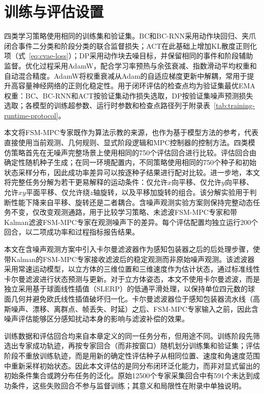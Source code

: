 \section{训练与评估设置}

四类学习策略使用相同的训练集和验证集。BC和BC-RNN采用动作块回归、夹爪闭合事件二分类和阶段分类的联合监督损失；ACT在此基础上增加KL散度正则化项（式~\eqref{eq:cvae-loss}）；DP采用动作块去噪目标，并保留相同的事件和阶段辅助监督。优化过程采用AdamW，配合学习率预热与余弦衰减、指数滑动平均权重和自动混合精度。AdamW将权重衰减从Adam的自适应梯度更新中解耦，常用于提升高容量神经网络的正则化稳定性\citep{loshchilov2019decoupled}。用于闭环评估的检查点均为验证集最优EMA权重：BC、BC-RNN和ACT按验证集动作损失选取，DP按验证集噪声预测损失选取；各模型的训练超参数、运行时参数和检查点路径列于附录表~\ref{tab:training-runtime-protocol}。

本文将FSM-MPC专家既作为算法示教的来源，也作为基于模型方法的参考，代表直接使用当前观测、几何规则、显式阶段逻辑和MPC控制器的控制方法。四类模仿策略首先在无噪声完整场景上使用相同的750个评估回合进行比较。评估回合由确定性随机种子生成；在同一环境配置内，不同策略使用相同的750个种子和初始状态采样分布，因此成功率差异可以按逐种子结果进行配对比较。进一步地，本文将完整任务分解为若干更易解释的运动条件：仅允许$x$向平移、仅允许$y$向平移、允许$xy$平面平移、仅允许绕$z$轴旋转，以及平移加旋转的组合。该分解实验用于判断性能下降来自平移、旋转还是二者耦合。含噪声观测实验方案则保持完整动态任务不变，仅改变观测通路，用于比较学习策略、未滤波FSM-MPC专家和带Kalman滤波FSM-MPC专家在观测噪声下的差异。每个评估配置均独立运行200个回合，以二项成功率和过程指标报告结果。

本文在含噪声观测方案中引入卡尔曼滤波器作为感知包装器之后的后处理步骤，使带Kalman的FSM-MPC专家接收滤波后的稳定观测而非原始噪声观测。该滤波器采用常速运动模型，以立方体的三维位置和三维速度作为估计状态，通过标准线性卡尔曼滤波进行状态预测与更新\citep{kalman1960new}。对于立方体姿态，本文不使用卡尔曼滤波，而是独立采用基于球面线性插值（SLERP）的低通平滑处理\citep{shoemake1985animating}，以保持单位四元数的球面几何并避免欧氏线性插值破坏归一化。卡尔曼滤波器位于感知包装器流水线（高斯噪声、漂移、离群点、帧丢失、时延）之后、FSM-MPC专家输入之前，因此含噪声评估能够区分感知扰动本身的影响与滤波补偿的效果。

训练数据和评估回合均来自本章定义的同一任务分布，但用途不同。训练阶段先筛选出专家成功轨迹，再按专家回合（而非按窗口）随机划分训练集和验证集；评估阶段不重放训练轨迹，而是用新的确定性评估种子从相同位置、速度和角速度范围中重新采样初始状态。因此本文评估的是同分布闭环泛化能力，而非对显式留出的初始条件集合或跨分布任务的泛化。原始12500个专家采集回合中有591个未达到成功条件，这些失败回合不参与监督训练；其意义和局限性在附录中单独说明。

